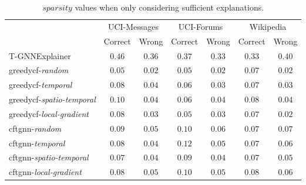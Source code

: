 \begin{table}[ht]
    \centering
    \small
    \begin{tabular}{lcccccc}
    \hline
         &  \multicolumn{2}{c}{UCI-Messages}&  \multicolumn{2}{c}{UCI-Forums}&  \multicolumn{2}{c}{Wikipedia}\\
         &  Correct&  Wrong&  Correct&  Wrong&  Correct& Wrong\\
         \hline
         T-GNNExplainer&  $0.46$&  $0.36$&  $0.37$&  $0.33$&  $0.33$& $0.40$\\
         \gls{greedycf}-\textit{random}&  $0.05$&  $0.02$&  $0.05$&  $0.02$&  $0.07$& $0.02$\\
         \gls{greedycf}-\textit{temporal}&  $0.08$&  $0.04$&  $0.06$&  $0.03$&  $0.07$& $0.03$\\
         \gls{greedycf}-\textit{spatio-temporal}&  $0.10$&  $0.04$&  $0.06$&  $0.04$&  $0.08$& $0.04$\\
         \gls{greedycf}-\textit{local-gradient}&  $0.08$&  $0.03$&  $0.05$&  $0.03$&  $0.07$& $0.02$\\
         \gls{cftgnn}-\textit{random}&  $0.09$&  $0.05$&  $0.10$&  $0.06$&  $0.07$& $0.07$\\
         \gls{cftgnn}-\textit{temporal}&  $0.08$&  $0.04$&  $0.12$&  $0.05$&  $0.07$& $0.06$\\
         \gls{cftgnn}-\textit{spatio-temporal}&  $0.07$&  $0.04$&  $0.09$&  $0.04$&  $0.07$& $0.05$\\
 \gls{cftgnn}-\textit{local-gradient}& $0.08$& $0.05$& $0.10$& $0.05$& $0.08$&$0.06$\\
 \hline
    \end{tabular}
    \caption{$sparsity$ values when only considering sufficient explanations.}
    \label{t_spar_suf}
\end{table}
